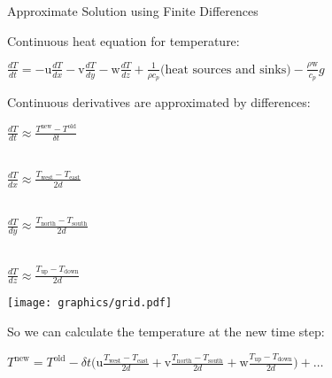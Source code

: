 \begin{slide}{Approximate Solution using Finite Differences}

\begin{list0}

\item Continuous heat equation for temperature:

$\frac{d T}{d t}
= -\text{u} \frac{dT}{dx} - \text{v} \frac{dT}{dy} - \text{w} \frac{dT}{dz}
+ \frac{1}{\rho c_p} \text{(heat sources and sinks)}
-\frac{\rho \text{w}}{c_p} g $
\end{list0}\pauseHS

\vspace{-24pt}
\begin{minipage}{0.59\linewidth}\raggedright
\begin{list0}
\item Continuous derivatives are approximated by differences:

$\frac{dT}{d t} \approx
\frac{T^\text{new} - T^\text{old}}{\delta t}$

\ \\
$\frac{dT}{dx} \approx \frac{T_\text{west} - T_\text{east}}{2d}$

\ \\
$\frac{dT}{dy} \approx \frac{T_\text{north} - T_\text{south}}{2d}$

\ \\
$\frac{dT}{dz} \approx \frac{T_\text{up} - T_\text{down}}{2d}$



\end{list0}
\end{minipage}
\begin{minipage}{0.39\linewidth}
\texttt{[image: graphics/grid.pdf]}
\end{minipage}

\pauseHS
So we can calculate the temperature at the new time step:
\pauseHS

$
T^\text{new} = T^\text{old} - \delta t
\biggl(
    \text{u}\frac{T_\text{west} - T_\text{east}}{2d}
  + \text{v}\frac{T_\text{north} - T_\text{south}}{2d}
  + \text{w}\frac{T_\text{up} - T_\text{down}}{2d}
\biggr) + \ldots
$
\end{slide}
